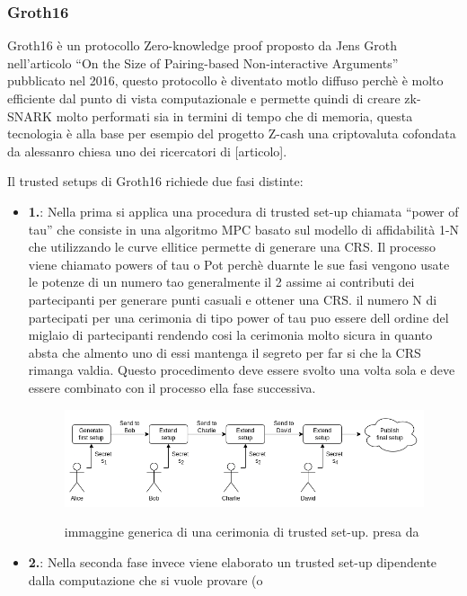 \subsubsection{Groth16}
Groth16 è un protocollo Zero-knowledge proof proposto da Jens Groth nell’articolo “On the Size of Pairing-based Non-interactive
Arguments”\cite{10.1007/978-3-662-49896-5_11} pubblicato nel 2016, questo protocollo è diventato motlo diffuso
perchè è molto efficiente dal punto di vista computazionale e permette quindi di creare zk-SNARK molto performati sia in
termini di tempo che di memoria, questa tecnologia è alla base per esempio del progetto Z-cash una criptovaluta
cofondata da alessanro chiesa uno dei ricercatori di [articolo].

Il trusted setups di Groth16 richiede due fasi distinte:
\begin{itemize}
    \item \textbf{1.}: Nella prima si applica una procedura di trusted set-up chiamata “power of tau” che consiste in una algoritmo MPC
    basato sul modello di affidabilità 1-N che utilizzando le curve ellitice permette di generare una CRS. Il processo viene
    chiamato powers of tau o Pot perchè duarnte le sue fasi vengono usate le potenze di un numero tao generalmente il 2
    assime ai contributi dei partecipanti per generare punti casuali e ottener una CRS. il numero N di partecipati per una
    cerimonia di tipo power of tau puo essere dell ordine del miglaio di partecipanti rendendo cosi la cerimonia molto
    sicura in quanto absta che almento uno di essi mantenga il segreto per far si che la CRS rimanga valdia. Questo
    procedimento deve essere svolto una volta sola e deve essere combinato con il processo ella fase successiva.
    \begin{figure}[H]
        \centering
        \includegraphics[width=15cm]{./chapters/1.state-of-art/images/13.power_of_tao.png}
        \label{fig:trusted_setups}
        \captionsetup{justification=centering}
        \caption{immaggine generica di una cerimonia di trusted set-up. presa da \cite{how-do-trusted-setups-work}}
    \end{figure}
    \item \textbf{2.}: Nella seconda fase invece viene elaborato un trusted set-up dipendente dalla computazione che si vuole provare (o

\end{itemize}

